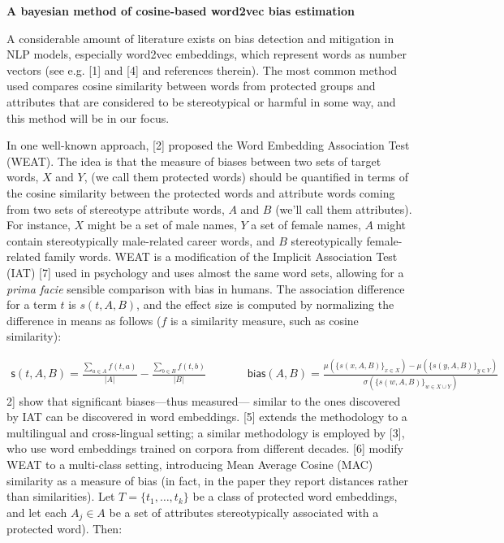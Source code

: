 \documentclass[
  12pt,
  dvipsnames,enabledeprecatedfontcommands]{scrartcl}
\author{}
\date{\vspace{-2.5em}}
\begin{document}
\begin{center}
\Large \textbf{A bayesian method of cosine-based word2vec bias estimation}
\end{center}

\vspace{1mm}


A considerable amount of literature exists on bias detection and
mitigation in NLP models, especially word2vec embeddings, which
represent words as number vectors (see e.g. {[}1{]} and {[}4{]} and
references therein). The most common method used compares cosine
similarity between words from protected groups and attributes that are
considered to be stereotypical or harmful in some way, and this method
will be in our focus.

In one well-known approach, {[}2{]} proposed the Word Embedding
Association Test (WEAT). The idea is that the measure of biases between
two sets of target words, \(X\) and \(Y\), (we call them protected
words) should be quantified in terms of the cosine similarity between
the protected words and attribute words coming from two sets of
stereotype attribute words, \(A\) and \(B\) (we'll call them
attributes). For instance, \(X\) might be a set of male names, \(Y\) a
set of female names, \(A\) might contain stereotypically male-related
career words, and \(B\) stereotypically female-related family words.
WEAT is a modification of the Implicit Association Test (IAT) {[}7{]}
used in psychology and uses almost the same word sets, allowing for a
\emph{prima facie} sensible comparison with bias in humans. The
association difference for a term \(t\) is \(s(t,A,B)\), and the effect
size is computed by normalizing the difference in means as follows
(\(f\) is a similarity measure, such as cosine similarity):

\vspace{-3mm}

\footnotesize \begin{align}
\mathsf{s}(t,A,B)  = \frac{\sum_{a\in A}f(t,a)}{\vert A\vert} - \frac{\sum_{b\in B}f(t,b)}{\vert B\vert}
& \,\,\,\,\,\,\,\,\,\,\,\,\,\,\,\,\,
\mathsf{bias}(A,B)  = \frac{
\mu(\{s(x,A,B)\}_{x\in X}) -\mu(\{s(y,A,B)\}_{y\in Y}) 
}{
\sigma(\{s(w,A,B)\}_{w\in X\cup Y})
} \tag{WEAT}
\end{align} \normalsize \noindent {[}2{]} show that significant
biases---thus measured--- similar to the ones discovered by IAT can be
discovered in word embeddings. {[}5{]} extends the methodology to a
multilingual and cross-lingual setting; a similar methodology is
employed by {[}3{]}, who use word embeddings trained on corpora from
different decades. {[}6{]} modify WEAT to a multi-class setting,
introducing Mean Average Cosine (MAC) similarity as a measure of bias
(in fact, in the paper they report distances rather than similarities).
Let \(T = \{t_1, \dots, t_k\}\) be a class of protected word embeddings,
and let each \(A_j\in A\) be a set of attributes stereotypically
associated with a protected word). Then:
\end{document}
